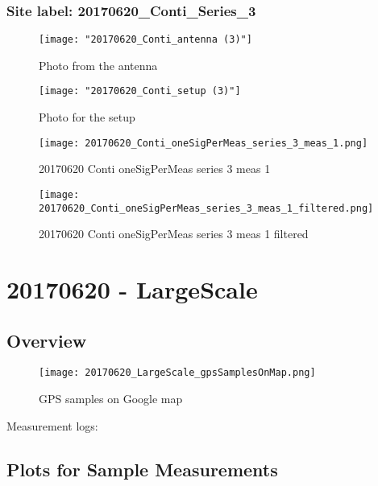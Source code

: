 \subsubsection{Site label: 20170620\_Conti\_Series\_3}
\begin{figure}[ht] \caption{Photo from the antenna}
\texttt{[image: "20170620\_Conti\_antenna (3)"]}\centering\end{figure}
\begin{figure}[ht] \caption{Photo for the setup}
\texttt{[image: "20170620\_Conti\_setup (3)"]}\centering\end{figure}
\begin{figure}[ht] \caption{20170620 Conti oneSigPerMeas series 3 meas 1}
\texttt{[image: 20170620\_Conti\_oneSigPerMeas\_series\_3\_meas\_1.png]}\centering\end{figure}
\begin{figure}[ht] \caption{20170620 Conti oneSigPerMeas series 3 meas 1 filtered}
\texttt{[image: 20170620\_Conti\_oneSigPerMeas\_series\_3\_meas\_1\_filtered.png]}\centering\end{figure}
\clearpage
\section{20170620 - LargeScale}
\subsection{Overview}
\begin{figure}[ht] \caption{GPS samples on Google map}
\texttt{[image: 20170620\_LargeScale\_gpsSamplesOnMap.png]}\centering\end{figure}
\begin{minipage}{\textwidth} Measurement logs:

 \end{minipage}
\clearpage
\subsection{Plots for Sample Measurements}
